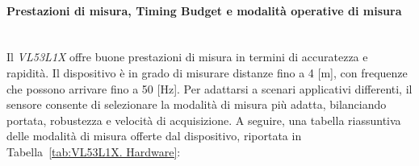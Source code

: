 \documentclass[11pt]{report}
\begin{document}
	\paragraph{\small{Prestazioni di misura, Timing Budget e modalità operative di misura}}\mbox{}\\
	Il \textit{VL53L1X} offre buone prestazioni di misura in termini di accuratezza e rapidità. Il dispositivo è in grado di misurare distanze fino a 4 [m], con frequenze che possono arrivare fino a 50 [Hz].
	Per adattarsi a scenari applicativi differenti, il sensore consente di selezionare la modalità di misura più adatta, bilanciando portata, robustezza e velocità di acquisizione.
	A seguire, una tabella riassuntiva delle modalità di misura offerte dal dispositivo, riportata in Tabella~\ref{tab:VL53L1X. Hardware}:
	\begin{table}[htb]
		\centering
		\caption{VL53L1X. Modalità di misura}
		\label{tab:VL53L1X. Hardware}
	\end{table}
	
\end{document}
